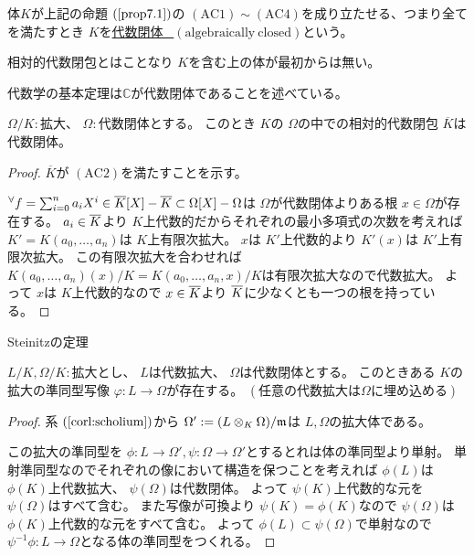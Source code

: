 \documentclass[../master_galois_theory]{subfiles}
\begin{document}
\begin{defi}
  体$K$が上記の命題 $(\mathrm{\ref{prop7.1}})$の $(\mathrm{AC}1) \sim (\mathrm{AC}4)$を成り立たせる、つまり全てを満たすとき
  $K$を\underline{代数閉体 \  $(\mathrm{algebraically \  closed})$}という。

  相対的代数閉包とはことなり $K$を含む上の体が最初からは無い。
\end{defi}

\begin{exam}
  代数学の基本定理は$\mathbb{C}$が代数閉体であることを述べている。
\end{exam}

\begin{prop}
  $\Omega/K:$拡大、 $\Omega :$代数閉体とする。
  このとき $K$の $\Omega$の中での相対的代数閉包 $\overline{K}$は代数閉体。
\end{prop}

\begin{proof}
  $\overline{K}$が $(\mathrm{AC}2)$を満たすことを示す。

  ${}^\forall f = \sum_{i=0}^n a_i X^i \in \overline{K}[X] - \overline{K} \subset \Omega[X] - \Omega$は
  $\Omega$が代数閉体よりある根 $x \in \Omega$が存在する。
  $a_i \in \overline{K}$より $K$上代数的だからそれぞれの最小多項式の次数を考えれば
  $K' = K(a_0 , \dots , a_n)$は $K$上有限次拡大。
  $x$は $K'$上代数的より
  $K'(x)$は $K'$上有限次拡大。
  この有限次拡大を合わせれば $K(a_0 , \dots , a_n)(x)/K = K(a_0 , \dots , a_n , x)/K$は有限次拡大なので代数拡大。
  よって $x$は $K$上代数的なので $x \in \overline{K}$より $\overline{K}$に少なくとも一つの根を持っている。
\end{proof}

\begin{theo} \label{theo:7.3}
  \rm{Steinitz}の定理

  $L/K , \Omega/K:$拡大とし、 $L$は代数拡大、 $\Omega$は代数閉体とする。
  このときある $K$の拡大の準同型写像 $\varphi : L \longrightarrow \Omega$が存在する。
  $(任意の代数拡大は \Omega に埋め込める)$
\end{theo}

\begin{proof}
  系 $(\mathrm{\ref{corl:scholium}})$から $\Omega' := (L \otimes_K \Omega)/\mathfrak{m}$は $L , \Omega$の拡大体である。

  この拡大の準同型を $\phi : L \longrightarrow \Omega' , \psi : \Omega \longrightarrow \Omega'$とするとれは体の準同型より単射。
  単射準同型なのでそれぞれの像において構造を保つことを考えれば
  $\phi(L)$は $\phi(K)$上代数拡大、 $\psi(\Omega)$は代数閉体。
  よって $\psi(K)$上代数的な元を $\psi(\Omega)$はすべて含む。
  また写像が可換より $\psi(K) = \phi(K)$なので
  $\psi(\Omega)$は $\phi(K)$上代数的な元をすべて含む。
  よって $\phi(L) \subset \psi(\Omega)$で単射なので
  $\psi^{-1}\phi : L \longrightarrow \Omega$となる体の準同型をつくれる。
\end{proof}
\end{document}
